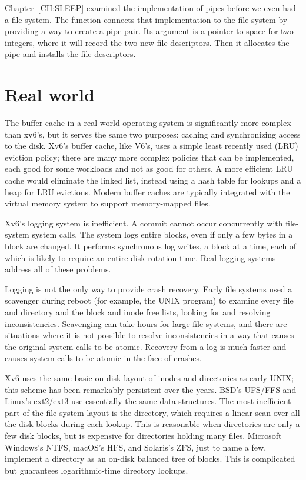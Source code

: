 Chapter~\ref{CH:SLEEP} examined the implementation of pipes
before we even had a file system.
The function
connects that implementation to the file system
by providing a way to create a pipe pair.
Its argument is a pointer to space for two integers,
where it will record the two new file descriptors.
Then it allocates the pipe and installs the file descriptors.
\section{Real world}

The buffer cache in a real-world operating system is significantly
more complex than xv6's, but it serves the same two purposes:
caching and synchronizing access to the disk.
Xv6's buffer cache, like V6's, uses a simple least recently used (LRU)
eviction policy; there are many more complex
policies that can be implemented, each good for some
workloads and not as good for others.
A more efficient LRU cache would eliminate the linked list,
instead using a hash table for lookups and a heap for LRU evictions.
Modern buffer caches are typically integrated with the
virtual memory system to support memory-mapped files.

Xv6's logging system is inefficient.
A commit cannot occur concurrently with file-system system calls.
The system logs entire blocks, even if
only a few bytes in a block are changed. It performs synchronous
log writes, a block at a time, each of which is likely to require an
entire disk rotation time. Real logging systems address all of these
problems.

Logging is not the only way to provide crash recovery. Early file systems
used a scavenger during reboot (for example, the UNIX
program) to examine every file and directory and the block and inode
free lists, looking for and resolving inconsistencies. Scavenging can take
hours for large file systems, and there are situations where it is not
possible to resolve inconsistencies in a way that causes the original
system calls to be atomic. Recovery
from a log is much faster and causes system calls to be atomic
in the face of crashes.

Xv6 uses the same basic on-disk layout of inodes and directories
as early UNIX;
this scheme has been remarkably persistent over the years.
BSD's UFS/FFS and Linux's ext2/ext3 use essentially the same data structures.
The most inefficient part of the file system layout is the directory,
which requires a linear scan over all the disk blocks during each lookup.
This is reasonable when directories are only a few disk blocks,
but is expensive for directories holding many files.
Microsoft Windows's NTFS, macOS's HFS, and Solaris's ZFS, just to name a few, implement
a directory as an on-disk balanced tree of blocks.
This is complicated but guarantees logarithmic-time directory lookups.

